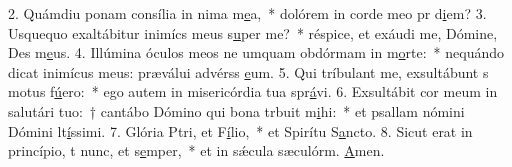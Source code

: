 2. Quámdiu ponam consília in nima m\uline{e}a,~* dolórem in corde meo pr d\uline{i}em?
3. Usquequo exaltábitur inimícs meus s\uline{u}per me?~* réspice, et exáudi me, Dómine, Des m\uline{e}us.
4. Illúmina óculos meos ne umquam obdórmam in m\uline{o}rte:~* nequándo dicat inimícus meus: præválui advérss \uline{e}um.
5. Qui tríbulant me, exsultábunt s motus f\uline{ú}ero:~* ego autem in misericórdia tua spr\uline{á}vi.
6. Exsultábit cor meum in salutári tuo:~† cantábo Dómino qui bona trbuit m\uline{i}hi:~* et psallam nómini Dómini lt\uline{í}ssimi.
7. Glória Ptri, et F\uline{í}lio,~* et Spirítu S\uline{a}ncto.
8. Sicut erat in princípio, t nunc, et s\uline{e}mper,~* et in sǽcula sæculórm. \uline{A}men.
